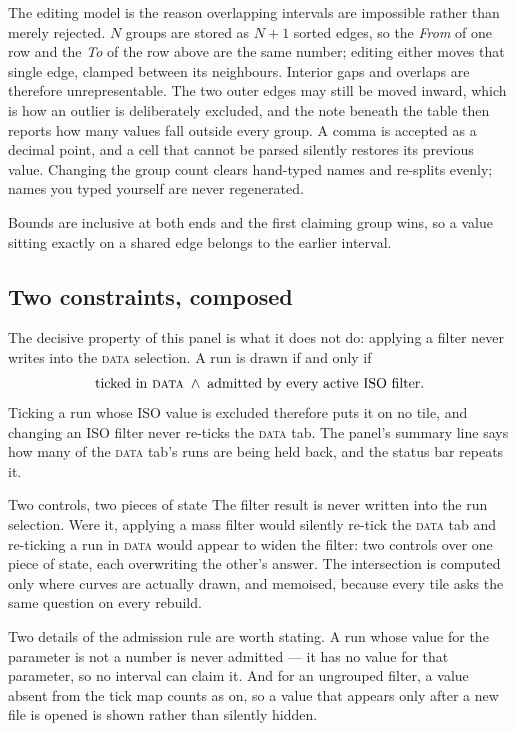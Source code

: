\documentclass[11pt,a4paper,oneside]{report}
\newcommand{\tab}[1]{\textsc{#1}}
\begin{document}
The editing model is the reason overlapping intervals are impossible rather than
merely rejected. $N$ groups are stored as $N+1$ sorted edges, so the \emph{From}
of one row and the \emph{To} of the row above are the same number; editing either
moves that single edge, clamped between its neighbours. Interior gaps and
overlaps are therefore unrepresentable. The two outer edges may still be moved
inward, which is how an outlier is deliberately excluded, and the note beneath
the table then reports how many values fall outside every group. A comma is
accepted as a decimal point, and a cell that cannot be parsed silently restores
its previous value. Changing the group count clears hand-typed names and
re-splits evenly; names you typed yourself are never regenerated.

Bounds are inclusive at both ends and the first claiming group wins, so a value
sitting exactly on a shared edge belongs to the earlier interval.

\subsection{Two constraints, composed}

The decisive property of this panel is what it does not do: applying a filter
never writes into the \tab{data} selection. A run is drawn if and only if
\[
  \text{ticked in \tab{data}} \;\wedge\; \text{admitted by every active ISO filter.}
\]
Ticking a run whose ISO value is excluded therefore puts it on no tile, and
changing an ISO filter never re-ticks the \tab{data} tab. The panel's summary
line says how many of the \tab{data} tab's runs are being held back, and the
status bar repeats it.

\begin{aoenote}{Two controls, two pieces of state}
The filter result is never written into the run selection. Were it, applying a
mass filter would silently re-tick the \tab{data} tab and re-ticking a run in
\tab{data} would appear to widen the filter: two controls over one piece of
state, each overwriting the other's answer. The intersection is computed only
where curves are actually drawn, and memoised, because every tile asks the same
question on every rebuild.
\end{aoenote}

Two details of the admission rule are worth stating. A run whose value for the
parameter is not a number is never admitted --- it has no value for that
parameter, so no interval can claim it. And for an ungrouped filter, a value
absent from the tick map counts as on, so a value that appears only after a new
file is opened is shown rather than silently hidden.
\end{document}
